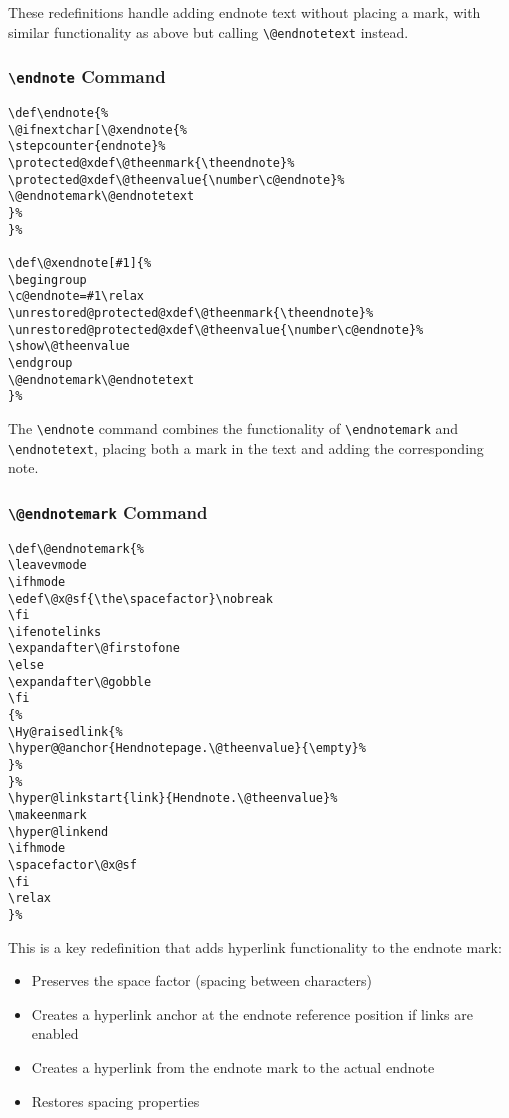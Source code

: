 \documentclass[11pt]{article}
\newcommand{\cmd}[1]{\texttt{\textbackslash#1}}
\begin{document}
These redefinitions handle adding endnote text without placing a mark, with similar functionality as above but calling \cmd{@endnotetext} instead.

\subsubsection{\cmd{endnote} Command}

\begin{tcolorbox}[colback=gray!5, colframe=gray!75, title=endnote Redefinition]
\begin{lstlisting}
\def\endnote{%
\@ifnextchar[\@xendnote{%
\stepcounter{endnote}%
\protected@xdef\@theenmark{\theendnote}%
\protected@xdef\@theenvalue{\number\c@endnote}%
\@endnotemark\@endnotetext
}%
}%

\def\@xendnote[#1]{%
\begingroup
\c@endnote=#1\relax
\unrestored@protected@xdef\@theenmark{\theendnote}%
\unrestored@protected@xdef\@theenvalue{\number\c@endnote}%
\show\@theenvalue
\endgroup
\@endnotemark\@endnotetext
}%
\end{lstlisting}
\end{tcolorbox}

The \cmd{endnote} command combines the functionality of \cmd{endnotemark} and \cmd{endnotetext}, placing both a mark in the text and adding the corresponding note.

\subsubsection{\cmd{@endnotemark} Command}

\begin{tcolorbox}[colback=gray!5, colframe=gray!75, title=@endnotemark Redefinition]
\begin{lstlisting}
\def\@endnotemark{%
\leavevmode
\ifhmode
\edef\@x@sf{\the\spacefactor}\nobreak
\fi
\ifenotelinks
\expandafter\@firstofone
\else
\expandafter\@gobble
\fi
{%
\Hy@raisedlink{%
\hyper@@anchor{Hendnotepage.\@theenvalue}{\empty}%
}%
}%
\hyper@linkstart{link}{Hendnote.\@theenvalue}%
\makeenmark
\hyper@linkend
\ifhmode
\spacefactor\@x@sf
\fi
\relax
}%
\end{lstlisting}
\end{tcolorbox}

This is a key redefinition that adds hyperlink functionality to the endnote mark:
\begin{itemize}
  \item Preserves the space factor (spacing between characters)
  \item Creates a hyperlink anchor at the endnote reference position if links are enabled
  \item Creates a hyperlink from the endnote mark to the actual endnote
  \item Restores spacing properties
\end{itemize}
\end{document}
